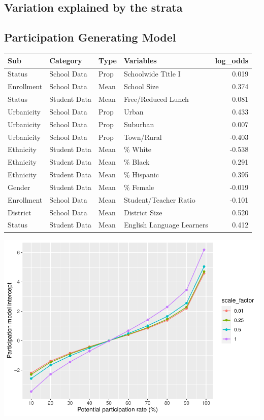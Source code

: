 \documentclass[
  man,floatsintext]{apa6}
\begin{document}
\hypertarget{variation-explained-by-the-strata}{%
\subsection{Variation explained by the strata}\label{variation-explained-by-the-strata}}

\hypertarget{participation-generating-model}{%
\subsection{Participation Generating Model}\label{participation-generating-model}}

\begin{table}
\centering
\begin{tabular}{l|l|l|l|r}
\hline
Sub & Category & Type & Variables & log\_odds\\
\hline
Status & School Data & Prop & Schoolwide Title I & 0.019\\
\hline
Enrollment & School Data & Mean & School Size & 0.374\\
\hline
Status & Student Data & Mean & Free/Reduced Lunch & 0.081\\
\hline
Urbanicity & School Data & Prop & Urban & 0.433\\
\hline
Urbanicity & School Data & Prop & Suburban & 0.007\\
\hline
Urbanicity & School Data & Prop & Town/Rural & -0.403\\
\hline
Ethnicity & Student Data & Mean & \% White & -0.538\\
\hline
Ethnicity & Student Data & Mean & \% Black & 0.291\\
\hline
Ethnicity & Student Data & Mean & \% Hispanic & 0.395\\
\hline
Gender & Student Data & Mean & \% Female & -0.019\\
\hline
Enrollment & School Data & Mean & Student/Teacher Ratio & -0.101\\
\hline
District & School Data & Mean & District Size & 0.520\\
\hline
Status & Student Data & Mean & English Language Learners & 0.412\\
\hline
\end{tabular}
\end{table}

\includegraphics{5---Analysis_files/figure-latex/unnamed-chunk-13-1.pdf}
\end{document}
